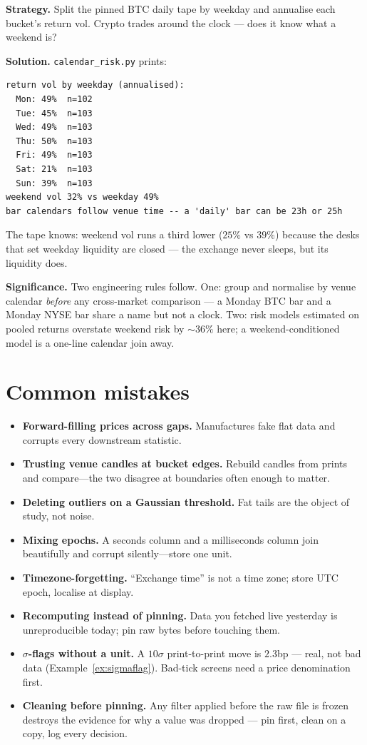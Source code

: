 \begin{example}\label{ex:wknd}
\textbf{Strategy.} Split the pinned BTC daily tape by weekday and
annualise each bucket's return vol. Crypto trades around the
clock --- does it know what a weekend is?

\textbf{Solution.} \texttt{calendar\_risk.py} prints:
\begin{verbatim}
return vol by weekday (annualised):
  Mon: 49%  n=102
  Tue: 45%  n=103
  Wed: 49%  n=103
  Thu: 50%  n=103
  Fri: 49%  n=103
  Sat: 21%  n=103
  Sun: 39%  n=103
weekend vol 32% vs weekday 49%
bar calendars follow venue time -- a 'daily' bar can be 23h or 25h
\end{verbatim}
The tape knows: weekend vol runs a third lower ($25\%$ vs $39\%$)
because the desks that set weekday liquidity are closed --- the
exchange never sleeps, but its liquidity does.

\textbf{Significance.} Two engineering rules follow. One: group
and normalise by venue calendar \emph{before} any cross-market
comparison --- a Monday BTC bar and a Monday NYSE bar share a name
but not a clock. Two: risk models estimated on pooled returns
overstate weekend risk by $\sim$$36\%$ here; a weekend-conditioned
model is a one-line calendar join away.
\end{example}

\section{Common mistakes}
\begin{itemize}
\item \textbf{Forward-filling prices across gaps.} Manufactures fake flat data and corrupts
  every downstream statistic.
\item \textbf{Trusting venue candles at bucket edges.} Rebuild candles from prints and
  compare---the two disagree at boundaries often enough to matter.
\item \textbf{Deleting outliers on a Gaussian threshold.} Fat tails are the object of study,
  not noise.
\item \textbf{Mixing epochs.} A seconds column and a milliseconds column join beautifully
  and corrupt silently---store one unit.
\item \textbf{Timezone-forgetting.} ``Exchange time'' is not a time zone; store UTC epoch,
  localise at display.
\item \textbf{Recomputing instead of pinning.} Data you fetched live yesterday is
  unreproducible today; pin raw bytes before touching them.
\item \textbf{$\sigma$-flags without a unit.} A $10\sigma$
print-to-print move is $2.3$bp --- real, not bad data
(Example~\ref{ex:sigmaflag}). Bad-tick screens need a price
denomination first.
\item \textbf{Cleaning before pinning.} Any filter applied before
the raw file is frozen destroys the evidence for why a value was
dropped --- pin first, clean on a copy, log every decision.\end{itemize}

